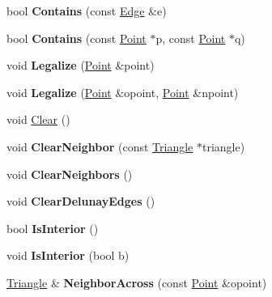 \begin{DoxyCompactItemize}
bool {\bfseries Contains} (const \hyperlink{structp2t_1_1Edge}{Edge} \&e)
\item 
\mbox{\label{classp2t_1_1Triangle_ae4a8991cd524e3f541c9c02dd86bce55}} 
bool {\bfseries Contains} (const \hyperlink{structp2t_1_1Point}{Point} $\ast$p, const \hyperlink{structp2t_1_1Point}{Point} $\ast$q)
\item 
\mbox{\label{classp2t_1_1Triangle_a3dcb2db468072495f8f287a749e3cf2a}} 
void {\bfseries Legalize} (\hyperlink{structp2t_1_1Point}{Point} \&point)
\item 
\mbox{\label{classp2t_1_1Triangle_ac1c464e079f8c373717640e70a10cba9}} 
void {\bfseries Legalize} (\hyperlink{structp2t_1_1Point}{Point} \&opoint, \hyperlink{structp2t_1_1Point}{Point} \&npoint)
\item 
void \hyperlink{classp2t_1_1Triangle_ad09dfbf0bc0917e4f0b32ffa735f5e6f}{Clear} ()
\item 
\mbox{\label{classp2t_1_1Triangle_a011fd7c02ffdac5acfc719174c4594db}} 
void {\bfseries Clear\+Neighbor} (const \hyperlink{classp2t_1_1Triangle}{Triangle} $\ast$triangle)
\item 
\mbox{\label{classp2t_1_1Triangle_aae3687cbc5c1b3e4964b3072ab97c463}} 
void {\bfseries Clear\+Neighbors} ()
\item 
\mbox{\label{classp2t_1_1Triangle_a435c14700eca2bee3c0e91ad8de051d8}} 
void {\bfseries Clear\+Delunay\+Edges} ()
\item 
\mbox{\label{classp2t_1_1Triangle_a9aaa9ee5f2184be6ffe64fe05b037233}} 
bool {\bfseries Is\+Interior} ()
\item 
\mbox{\label{classp2t_1_1Triangle_a6b39c78063b3af04d8cc156f4d4758c4}} 
void {\bfseries Is\+Interior} (bool b)
\item 
\mbox{\label{classp2t_1_1Triangle_a4cef6629b80a9494d2834935e3bfdfa0}} 
\hyperlink{classp2t_1_1Triangle}{Triangle} \& {\bfseries Neighbor\+Across} (const \hyperlink{structp2t_1_1Point}{Point} \&opoint)
\item 

\end{DoxyCompactItemize}
